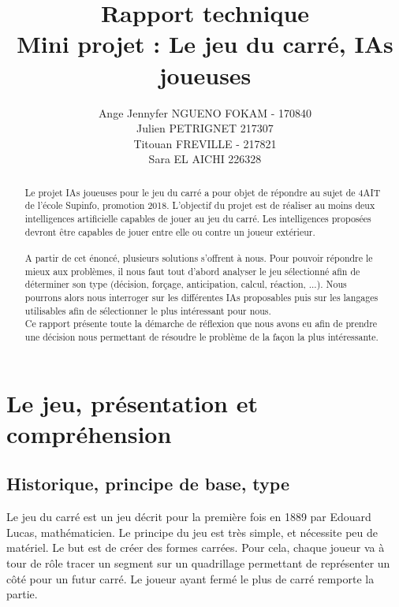 \documentclass[a4paper,12pt]{report}
\title{Rapport technique \\Mini projet : Le jeu du carré, IAs joueuses}
\author{Ange Jennyfer NGUENO FOKAM - 170840\\Julien PETRIGNET 217307\\Titouan FREVILLE - 217821\\Sara EL AICHI 226328}
\begin{document}
\maketitle
\tableofcontents
\listoffigures

\begin{abstract}
Le projet IAs joueuses pour le jeu du carré a pour objet de répondre au sujet de 4AIT de l'école Supinfo, promotion 2018. L'objectif du projet est de réaliser au moins deux intelligences artificielle capables de jouer au jeu du carré. Les intelligences propos\'ees devront \^etre capables de jouer entre elle ou contre un joueur ext\'erieur. \\
\\
A partir de cet \'enonc\'e, plusieurs solutions s'offrent \`a nous. Pour pouvoir r\'epondre le mieux aux probl\`emes, il nous faut tout d'abord analyser le jeu s\'electionn\'e afin de d\'eterminer son type (d\'ecision, for\c{c}age, anticipation, calcul, r\'eaction, ...). Nous pourrons alors nous interroger sur les diff\'erentes IAs proposables puis sur les langages utilisables afin de s\'electionner le plus intéressant pour nous.
\\
Ce rapport pr\'esente toute la d\'emarche de r\'eflexion que nous avons eu afin de prendre une d\'ecision nous permettant de r\'esoudre le probl\`eme de la fa\c{c}on la plus intéressante.
\end{abstract}

\part{Le jeu, pr\'esentation et compr\'ehension}

\chapter{Historique, principe de base, type}
Le jeu du carr\'e est un jeu d\'ecrit pour la premi\`ere fois en 1889 par Edouard Lucas, math\'ematicien. Le principe du jeu est tr\`es simple, et nécessite peu de mat\'eriel. Le but est de cr\'eer des formes carr\'ees. Pour cela, chaque joueur va \`a tour de r\^ole tracer un segment sur un quadrillage permettant de repr\'esenter un c\^ot\'e pour un futur carr\'e. Le joueur ayant ferm\'e le plus de carr\'e remporte la partie.
\end{document}
